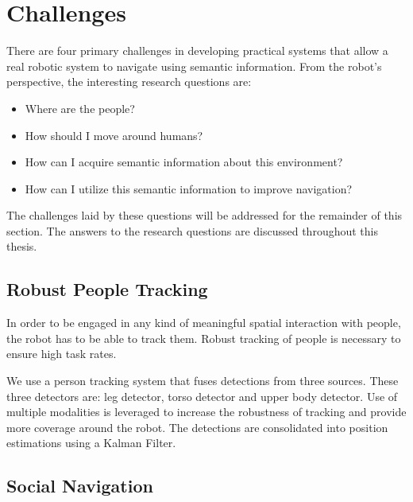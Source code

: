 \documentclass[12pt]{gatech-thesis}
\begin{document}
\section{Challenges}

There are four primary challenges in developing practical systems that allow a real robotic system to navigate using semantic information. From the robot's perspective, the interesting research questions are:

\begin{itemize}
\item Where are the people?
\item How should I move around humans?
\item How can I acquire semantic information about this environment?
\item How can I utilize this semantic information to improve navigation?
\end{itemize}

The challenges laid by these questions will be addressed for the remainder of this section. The answers to the research questions are discussed throughout this thesis.

\subsection{Robust People Tracking}

In order to be engaged in any kind of meaningful spatial interaction with people, the robot has to be able to track them. Robust tracking of people is necessary to ensure high task rates.

We use a person tracking system that fuses detections from three sources. These three detectors are: leg detector, torso detector and upper body detector. Use of multiple modalities is leveraged to increase the robustness of tracking and provide more coverage around the robot. The detections are consolidated into position estimations using a Kalman Filter.

\subsection{Social Navigation}
\end{document}
